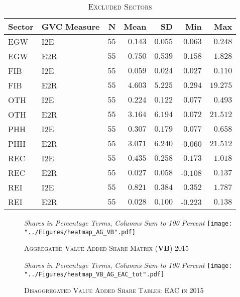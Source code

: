 \documentclass[a4paper]{article}
\begin{document}
\begin{table}[h!] \centering 
  \caption{\label{tab:EXCL_SEC}\textsc{Excluded Sectors}}
  \vspace{2mm}
\begin{tabular}{ llrrrrr} \toprule
Sector & GVC Measure  & N & Mean & SD & Min & Max \\ 
\midrule
EGW & I2E & $55$ & $0.143$ & $0.055$ & $0.063$ & $0.248$ \\ 
EGW & E2R & $55$ & $0.750$ & $0.539$ & $0.158$ & $1.828$ \\ 
FIB & I2E & $55$ & $0.059$ & $0.024$ & $0.027$ & $0.110$ \\ 
FIB & E2R & $55$ & $4.603$ & $5.225$ & $0.294$ & $19.275$ \\ 
OTH & I2E & $55$ & $0.224$ & $0.122$ & $0.077$ & $0.493$ \\ 
OTH & E2R & $55$ & $3.164$ & $6.194$ & $0.072$ & $21.512$ \\ 
PHH & I2E & $55$ & $0.307$ & $0.179$ & $0.077$ & $0.658$ \\ 
PHH & E2R & $55$ & $3.071$ & $6.240$ & -$0.060$ & $21.512$ \\ 
REC & I2E & $55$ & $0.435$ & $0.258$ & $0.173$ & $1.018$ \\ 
REC & E2R & $55$ & $0.027$ & $0.058$ & -$0.108$ & $0.137$ \\ 
REI & I2E & $55$ & $0.821$ & $0.384$ & $0.352$ & $1.787$ \\ 
REI & E2R & $55$ & $0.028$ & $0.100$ & -$0.223$ & $0.138$ \\ \bottomrule
\end{tabular} 
\end{table} 
\FloatBarrier

\begin{figure}[h!]
\centering
\caption{\label{fig:wldVB}\textsc{Aggregated Value Added Share Matrix (\textbf{VB}) 2015}}
\small{\textit{Shares in Percentage Terms, Columns Sum to 100 Percent}}
\texttt{[image: "../Figures/heatmap\_AG\_VB".pdf]} %
\end{figure}
\FloatBarrier

\begin{figure}[h!]
\centering
\caption{\label{fig:eacVB}\textsc{Disaggregated Value Added Share Tables: EAC in 2015}}
\small{\textit{Shares in Percentage Terms, Columns Sum to 100 Percent}}
\texttt{[image: "../Figures/heatmap\_VB\_AG\_EAC\_tot".pdf]} %
\end{figure}
\FloatBarrier
\end{document}
